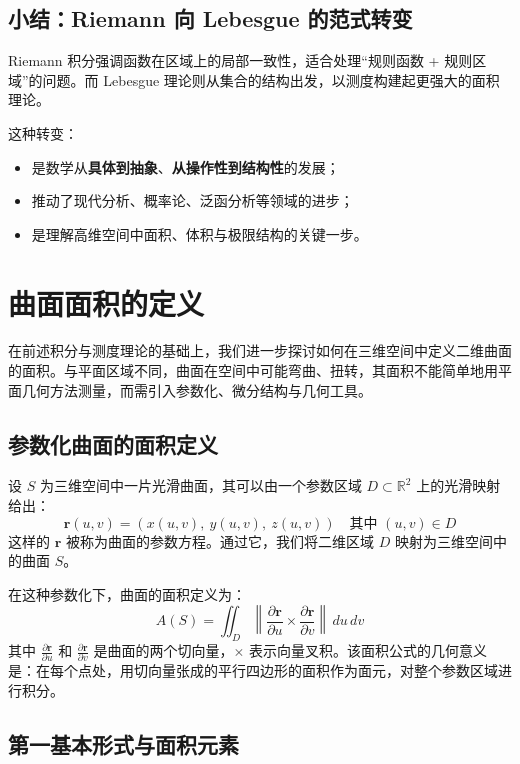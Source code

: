 \documentclass[a4paper, oneside]{article}
\begin{document}
\subsection{小结：Riemann 向 Lebesgue 的范式转变}

Riemann 积分强调函数在区域上的局部一致性，适合处理“规则函数 + 规则区域”的问题。而 Lebesgue 理论则从集合的结构出发，以测度构建起更强大的面积理论。

这种转变：
\begin{itemize}
    \item 是数学从\textbf{具体到抽象}、\textbf{从操作性到结构性}的发展；
    \item 推动了现代分析、概率论、泛函分析等领域的进步；
    \item 是理解高维空间中面积、体积与极限结构的关键一步。
\end{itemize}

\section{曲面面积的定义}

在前述积分与测度理论的基础上，我们进一步探讨如何在三维空间中定义二维曲面的面积。与平面区域不同，曲面在空间中可能弯曲、扭转，其面积不能简单地用平面几何方法测量，而需引入参数化、微分结构与几何工具。

\subsection{参数化曲面的面积定义}

设 $S$ 为三维空间中一片光滑曲面，其可以由一个参数区域 $D \subset \mathbb{R}^2$ 上的光滑映射给出：
\[
\boldsymbol{r}(u,v) = (x(u,v),\ y(u,v),\ z(u,v)) \quad \text{其中 } (u,v) \in D
\]
这样的 $\boldsymbol{r}$ 被称为曲面的参数方程。通过它，我们将二维区域 $D$ 映射为三维空间中的曲面 $S$。

在这种参数化下，曲面的面积定义为：
\[
A(S) = \iint_D \left\| \frac{\partial \boldsymbol{r}}{\partial u} \times \frac{\partial \boldsymbol{r}}{\partial v} \right\| \, du\,dv
\]
其中 $\frac{\partial \boldsymbol{r}}{\partial u}$ 和 $\frac{\partial \boldsymbol{r}}{\partial v}$ 是曲面的两个切向量，$\times$ 表示向量叉积。该面积公式的几何意义是：在每个点处，用切向量张成的平行四边形的面积作为面元，对整个参数区域进行积分。

\subsection{第一基本形式与面积元素}
\end{document}
